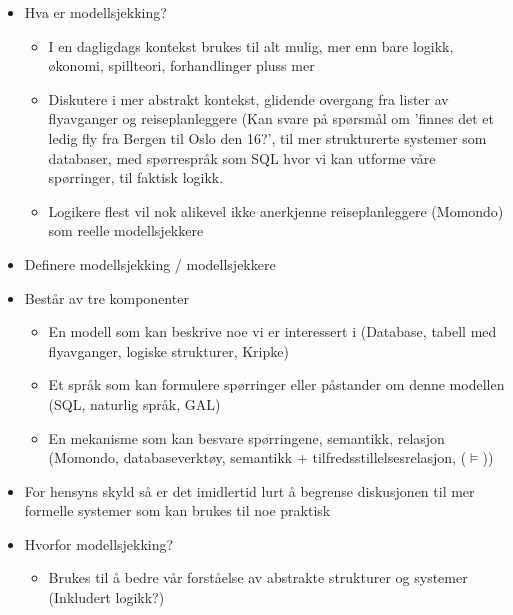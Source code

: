 \begin{itemize}

	\item{Hva er modellsjekking?}
	
	\begin{itemize}
		\item{I en dagligdags kontekst brukes til alt mulig, mer enn bare logikk, økonomi, spillteori, forhandlinger pluss mer}
		\item{Diskutere i mer abstrakt kontekst, glidende overgang fra lister av flyavganger og reiseplanleggere (Kan svare på spørsmål om 'finnes det et ledig fly fra Bergen til Oslo den 16?', til mer strukturerte systemer som databaser, med spørrespråk som SQL hvor vi kan utforme våre spørringer, til faktisk logikk.}
		\item{Logikere flest vil nok alikevel ikke anerkjenne reiseplanleggere (Momondo) som reelle modellsjekkere}
	\end{itemize}
	
	\item{Definere modellsjekking / modellsjekkere}
	
	\item{Består av tre komponenter}
	\begin{itemize}
		\item{En modell som kan beskrive noe vi er interessert i (Database, tabell med flyavganger, logiske strukturer, Kripke)}
		\item{Et språk som kan formulere spørringer eller påstander om denne modellen (SQL, naturlig språk, GAL)}
		\item{En mekanisme som kan besvare spørringene, semantikk, relasjon (Momondo, databaseverktøy, semantikk + tilfredsstillelsesrelasjon, ($\models$)})
	\end{itemize}
	
	\item{For hensyns skyld så er det imidlertid lurt å begrense diskusjonen til mer formelle systemer som kan brukes til noe praktisk}
	 
	\item{Hvorfor modellsjekking?}
	
	\begin{itemize}
	
		\item{Brukes til å bedre vår forståelse av abstrakte strukturer og systemer (Inkludert logikk?)}
		

\end{itemize}
\end{itemize}
